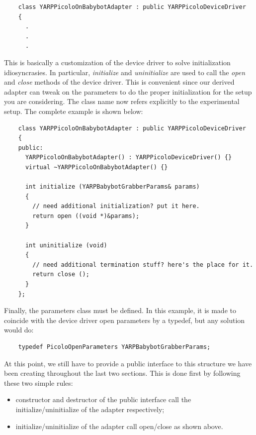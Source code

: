 \begin{verbatim}
    class YARPPicoloOnBabybotAdapter : public YARPPicoloDeviceDriver
    {
      .
      .
      .
\end{verbatim}

This is basically a customization of the device driver to solve initialization idiosyncrasies. In particular, {\em initialize} and {\em uninitialize} are used to call the {\em open} and {\em close} methods of the device driver. This is convenient since our derived adapter can tweak on the parameters to do the proper initialization for the setup you are considering. The class name now refers explicitly to the experimental setup. The complete example is shown below:

\begin{verbatim}
    class YARPPicoloOnBabybotAdapter : public YARPPicoloDeviceDriver
    {
    public:
      YARPPicoloOnBabybotAdapter() : YARPPicoloDeviceDriver() {}
      virtual ~YARPPicoloOnBabybotAdapter() {}

      int initialize (YARPBabybotGrabberParams& params)
      {
        // need additional initialization? put it here.
        return open ((void *)&params);
      }

      int uninitialize (void)
      {
        // need additional termination stuff? here's the place for it.
        return close ();
      }
    };
\end{verbatim}

Finally, the parameters class must be defined. In this example, it is made to coincide with the device driver open parameters by a typedef, but any solution would do:

\begin{verbatim}
    typedef PicoloOpenParameters YARPBabybotGrabberParams;
\end{verbatim}

At this point, we still have to provide a public interface to this structure we have been creating throughout the last two sections. This is done first by following these two simple rules:
\begin{itemize}

\item constructor and destructor of the public interface call the initialize/uninitialize of the adapter respectively;

\item initialize/uninitialize of the adapter call open/close as shown above.

\end{itemize}

